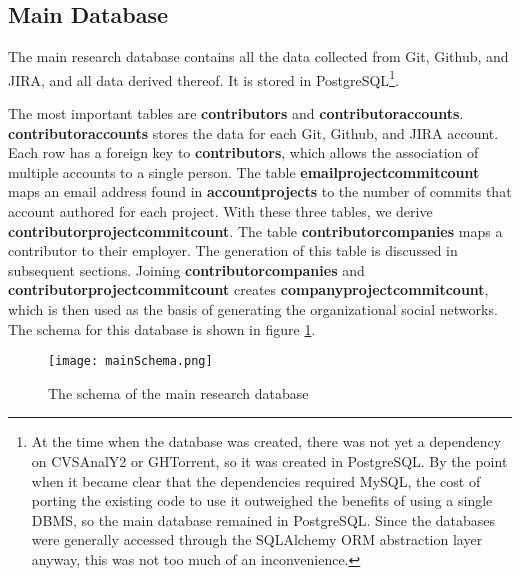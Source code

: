 \subsection{Main Database}
The main research database contains all the data collected from Git, Github, and JIRA, and all data derived thereof. It is stored in PostgreSQL\footnote{At the time when the database was created, there was not yet a dependency on CVSAnalY2 or GHTorrent, so it was created in PostgreSQL. By the point when it became clear that the dependencies required MySQL, the cost of porting the existing code to use it outweighed the benefits of using a single DBMS, so the main database remained in PostgreSQL. Since the databases were generally accessed through the SQLAlchemy ORM abstraction layer anyway, this was not too much of an inconvenience.}.

The most important tables are \textbf{contributors} and \textbf{contributoraccounts}. \textbf{contributoraccounts} stores the data for each Git, Github, and JIRA account. Each row has a foreign key to \textbf{contributors}, which allows the association of multiple accounts to a single person. The table \textbf{emailprojectcommitcount} maps an email address found in \textbf{accountprojects} to the number of commits that account authored for each project. With these three tables, we derive \textbf{contributorprojectcommitcount}. The table \textbf{contributorcompanies} maps a contributor to their employer. The generation of this table is discussed in subsequent sections. Joining \textbf{contributorcompanies} and \textbf{contributorprojectcommitcount} creates \textbf{companyprojectcommitcount}, which is then used as the basis of generating the organizational social networks. The schema for this database is shown in figure \ref{fig:mainSchema}.
\begin{figure}
	\texttt{[image: mainSchema.png]}
	\centering
	\caption{The schema of the main research database}
	\label{fig:mainSchema}
\end{figure}


